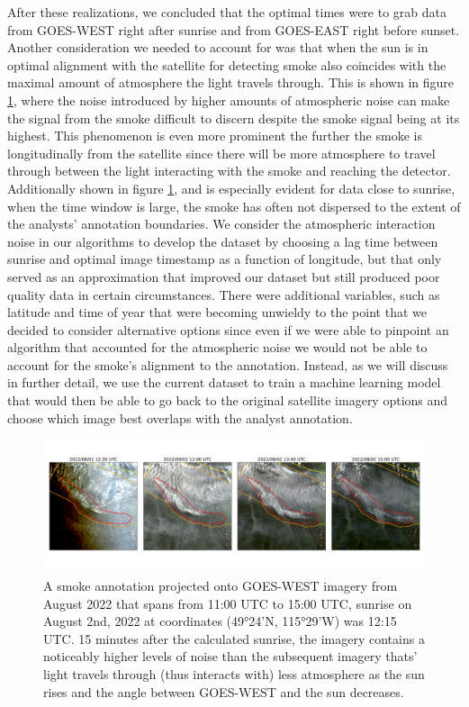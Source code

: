 \documentclass{ametsocV6.1}
\begin{document}
After these realizations, we concluded that the optimal times were to grab data from GOES-WEST right after sunrise and from GOES-EAST right before sunset. Another consideration we needed to account for was that when the sun is in optimal alignment with the satellite for detecting smoke also coincides with the maximal amount of atmosphere the light travels through. This is shown in figure \ref{G17_sunrise}, where the noise introduced by higher amounts of atmospheric noise can make the signal from the smoke difficult to discern despite the smoke signal being at its highest. This phenomenon is even more prominent the further the smoke is longitudinally from the satellite since there will be more atmosphere to travel through between the light interacting with the smoke and reaching the detector. Additionally shown in figure \ref{G17_sunrise}, and is especially evident for data close to sunrise, when the time window is large, the smoke has often not dispersed to the extent of the analysts' annotation boundaries. We consider the atmospheric interaction noise in our algorithms to develop the dataset by choosing a lag time between sunrise and optimal image timestamp as a function of longitude, but that only served as an approximation that improved our dataset but still produced poor quality data in certain circumstances. There were additional variables, such as latitude and time of year that were becoming unwieldy to the point that we decided to consider alternative options since even if we were able to pinpoint an algorithm that accounted for the atmospheric noise we would not be able to account for the smoke's alignment to the annotation.  Instead, as we will discuss in further detail, we use the current dataset to train a machine learning model that would then be able to go back to the original satellite imagery options and choose which image best overlaps with the analyst annotation.

\begin{figure}
    \centering
    \includegraphics[width=16cm]{figures/timelapse_G17_2.png}
    \caption{A smoke annotation projected onto GOES-WEST imagery from August 2022 that spans from 11:00 UTC to 15:00 UTC, sunrise on August 2nd, 2022 at coordinates (49°24'N, 115°29'W) was 12:15 UTC. 15 minutes after the calculated sunrise, the imagery contains a noticeably higher levels of noise than the subsequent imagery thats' light travels through (thus interacts with) less atmosphere as the sun rises and the angle between GOES-WEST and the sun decreases. }\label{G17_sunrise}
\end{figure}
\end{document}
